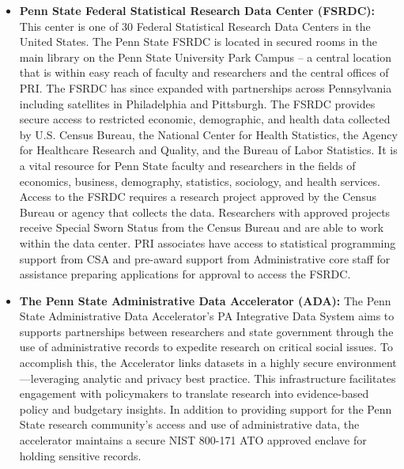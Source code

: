 \documentclass[11pt]{article}
\begin{document}
\begin{itemize}
 

Additional equipment (i.e. laptops, projectors, and tablets) for short term use and support for remote access, online webinar and meeting hosting are all available in PRI from SSRI Research IT, services that were tremendously useful during the most recent period of campus restrictions during the coronavirus pandemic. Although in-person, face to face collaboration is often preferred, PRI has the capability to continue its activities remotely and keep associates engaged with SSRI IT support for online meetings, methodology workshops, webinars, and the NIH writing group when necessary.  

\item \textbf{Penn State Federal Statistical Research Data Center (FSRDC):} 
This center is one of 30 Federal Statistical Research Data Centers in the United States. The Penn State FSRDC is located in secured rooms in the main library on the Penn State University Park Campus – a central location that is within easy reach of faculty and researchers and the central offices of PRI. The FSRDC has since expanded with partnerships across Pennsylvania including satellites in Philadelphia and Pittsburgh. The FSRDC provides secure access to restricted economic, demographic, and health data collected by U.S. Census Bureau, the National Center for Health Statistics, the Agency for Healthcare Research and Quality, and the Bureau of Labor Statistics. It is a vital resource for Penn State faculty and researchers in the fields of economics, business, demography, statistics, sociology, and health services. Access to the FSRDC requires a research project approved by the Census Bureau or agency that collects the data. Researchers with approved projects receive Special Sworn Status from the Census Bureau and are able to work within the data center. PRI associates have access to statistical programming support from CSA and pre-award support from Administrative core staff for assistance preparing applications for approval to access the FSRDC.  

\item \textbf{The Penn State Administrative Data Accelerator (ADA):} 
The Penn State Administrative Data Accelerator’s PA Integrative Data System aims to supports partnerships between researchers and state government through the use of administrative records to expedite research on critical social issues. To accomplish this, the Accelerator links datasets in a highly secure environment—leveraging analytic and privacy best practice. This infrastructure facilitates engagement with policymakers to translate research into evidence-based policy and budgetary insights. In addition to providing support for the Penn State research community’s access and use of administrative data, the accelerator maintains a secure NIST 800-171 ATO approved enclave for holding sensitive records.  


\end{itemize}
\end{document}
